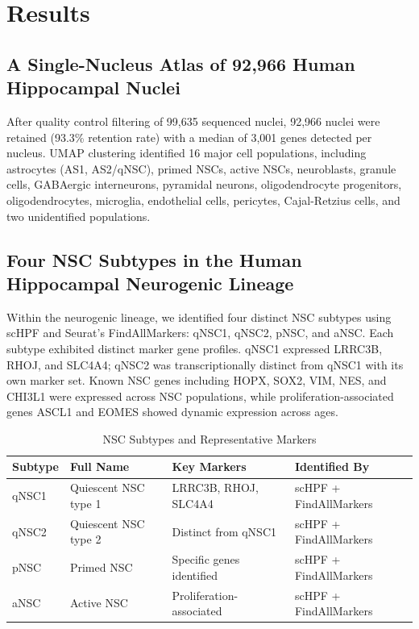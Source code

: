 \documentclass[11pt]{article}
\begin{document}
\section{Results}

\subsection{A Single-Nucleus Atlas of 92,966 Human Hippocampal Nuclei}

After quality control filtering of 99,635 sequenced nuclei, 92,966 nuclei were retained (93.3\% retention rate) with a median of 3,001 genes detected per nucleus. UMAP clustering identified 16 major cell populations, including astrocytes (AS1, AS2/qNSC), primed NSCs, active NSCs, neuroblasts, granule cells, GABAergic interneurons, pyramidal neurons, oligodendrocyte progenitors, oligodendrocytes, microglia, endothelial cells, pericytes, Cajal-Retzius cells, and two unidentified populations.

\subsection{Four NSC Subtypes in the Human Hippocampal Neurogenic Lineage}

Within the neurogenic lineage, we identified four distinct NSC subtypes using scHPF and Seurat's FindAllMarkers: qNSC1, qNSC2, pNSC, and aNSC. Each subtype exhibited distinct marker gene profiles. qNSC1 expressed LRRC3B, RHOJ, and SLC4A4; qNSC2 was transcriptionally distinct from qNSC1 with its own marker set. Known NSC genes including HOPX, SOX2, VIM, NES, and CHI3L1 were expressed across NSC populations, while proliferation-associated genes ASCL1 and EOMES showed dynamic expression across ages.

\begin{table}[ht]
\centering
\caption{NSC Subtypes and Representative Markers}
\label{tab:nsc}
\begin{tabular}{llll}
\toprule
\textbf{Subtype} & \textbf{Full Name} & \textbf{Key Markers} & \textbf{Identified By} \\
\midrule
qNSC1 & Quiescent NSC type 1 & LRRC3B, RHOJ, SLC4A4 & scHPF + FindAllMarkers \\
qNSC2 & Quiescent NSC type 2 & Distinct from qNSC1 & scHPF + FindAllMarkers \\
pNSC & Primed NSC & Specific genes identified & scHPF + FindAllMarkers \\
aNSC & Active NSC & Proliferation-associated & scHPF + FindAllMarkers \\
\bottomrule
\end{tabular}
\end{table}
\end{document}
